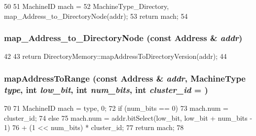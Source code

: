 \begin{DoxyCode}
50 {
51     MachineID mach =
52         {MachineType_Directory, map_Address_to_DirectoryNode(addr)};
53     return mach;
54 }
\end{DoxyCode}
\hypertarget{RubySlicc__ComponentMapping_8hh_a4bd5481fa181d267b902fe3825117932}{
\subsubsection[{map\_\-Address\_\-to\_\-DirectoryNode}]{ map\_\-Address\_\-to\_\-DirectoryNode (const {\bf Address} \& {\em addr})}}
\label{RubySlicc__ComponentMapping_8hh_a4bd5481fa181d267b902fe3825117932}



\begin{DoxyCode}
42 {
43     return DirectoryMemory::mapAddressToDirectoryVersion(addr);
44 }
\end{DoxyCode}
\hypertarget{RubySlicc__ComponentMapping_8hh_ac9143afac20963e128e48ed7629da9d0}{
\subsubsection[{mapAddressToRange}]{ mapAddressToRange (const {\bf Address} \& {\em addr}, \/  MachineType {\em type}, \/  int {\em low\_\-bit}, \/  int {\em num\_\-bits}, \/  int {\em cluster\_\-id} = {})}}
\label{RubySlicc__ComponentMapping_8hh_ac9143afac20963e128e48ed7629da9d0}



\begin{DoxyCode}
70 {
71     MachineID mach = {type, 0};
72     if (num_bits == 0)
73         mach.num = cluster_id;
74     else
75         mach.num = addr.bitSelect(low_bit, low_bit + num_bits - 1)
76             + (1 << num_bits) * cluster_id;
77     return mach;
78 }
\end{DoxyCode}
